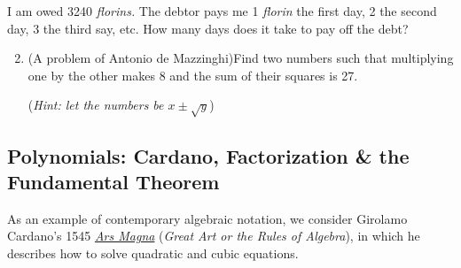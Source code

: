 \begin{exercises}{}{}
	\exstart %
		I am owed 3240 \emph{florins.} The debtor pays me 1 \emph{florin} the first day, 2 the second day, 3 the third say, etc. How many days does it take to pay off the debt?
		
	\begin{enumerate}\setcounter{enumi}{1}
		\item%
		(A problem of Antonio de Mazzinghi)\lstsp Find two numbers such that multiplying one by the other makes 8 and the sum of their squares is 27.\par
		(\emph{Hint: let the numbers be $x\pm\sqrt y$})
	\end{enumerate}
\end{exercises}

\clearpage



\subsection{Polynomials: Cardano, Factorization \& the Fundamental Theorem}

As an example of contemporary algebraic notation, we consider Girolamo Cardano's 1545 \href{http://math.uci.edu/~ndonalds/math184/cardano.pdf}{\emph{Ars Magna}} (\emph{Great Art or the Rules of Algebra}), in which he describes how to solve quadratic and cubic equations.\par

